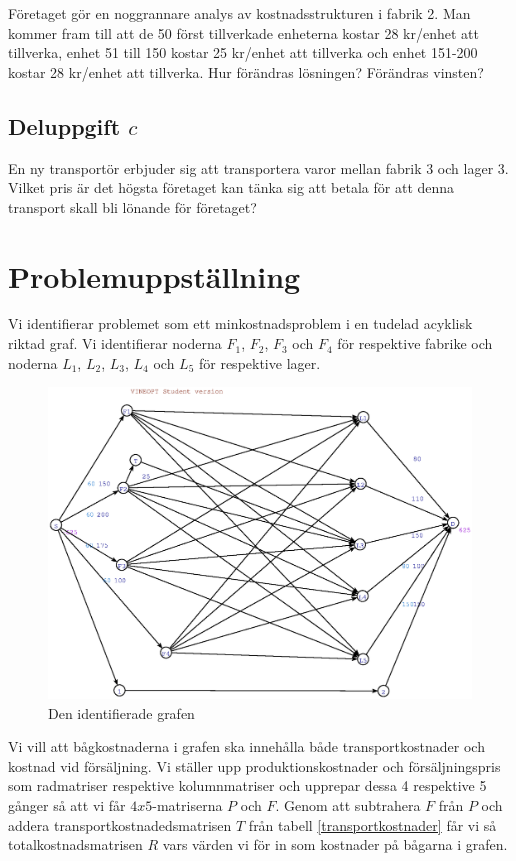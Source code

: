 \documentclass[titlepage, a4paper]{article}
\begin{document}
Företaget gör en noggrannare analys av kostnadsstrukturen i fabrik 2. Man kommer fram till att de 50 först tillverkade enheterna kostar 28 kr/enhet att tillverka, enhet 51 till 150 kostar 25 kr/enhet att tillverka och enhet 151-200 kostar 28 kr/enhet att tillverka. Hur förändras lösningen? Förändras vinsten?

\subsection{Deluppgift $c$}

En ny transportör erbjuder sig att transportera varor mellan fabrik 3 och lager 3. Vilket pris är det högsta företaget kan tänka sig att betala för att denna transport skall bli lönande för företaget?

\section{Problemuppställning}

Vi identifierar problemet som ett minkostnadsproblem i en tudelad acyklisk riktad graf. Vi identifierar noderna $F_{1}$, $F_{2}$, $F_{3}$ och $F_{4}$ för respektive fabrike och noderna $L_{1}$, $L_{2}$, $L_{3}$, $L_{4}$ och $L_{5}$ för respektive lager.

\begin{figure}[h!]
    \centerline{\includegraphics[scale=0.65]{laborationsuppgift_13a_original.ps}}
    \caption{Den identifierade grafen}
\end{figure}

Vi vill att bågkostnaderna i grafen ska innehålla både transportkostnader och kostnad vid försäljning. Vi ställer upp produktionskostnader och försäljningspris som radmatriser respektive kolumnmatriser och upprepar dessa 4 respektive 5 gånger så att vi får $4x5$-matriserna $P$ och $F$. Genom att subtrahera $F$ från $P$ och addera transportkostnadedsmatrisen $T$ från tabell \ref{transportkostnader} får vi så totalkostnadsmatrisen $R$ vars värden vi för in som kostnader på bågarna i grafen.
\end{document}
